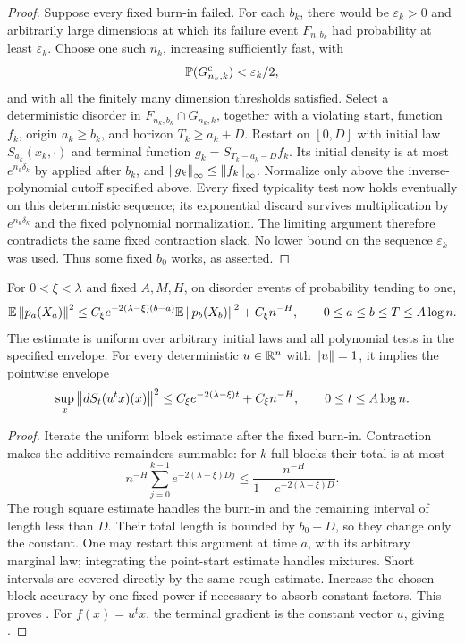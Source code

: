 \begin{proof}
Suppose every fixed burn-in failed.  For each $b_k$, there would be
$\varepsilon_k>0$ and arbitrarily large dimensions at which its
failure event $F_{n,b_k}$ had probability at least
$\varepsilon_k$.  Choose one such $n_k$, increasing sufficiently
fast, with
\[
 \P(G_{n_k,k}^{\mathrm c})<\varepsilon_k/2,
\]
and with all the finitely many dimension thresholds satisfied.  Select
a deterministic disorder in $F_{n_k,b_k}\cap G_{n_k,k}$, together
with a violating start, function $f_k$, origin $a_k\ge b_k$, and
horizon $T_k\ge a_k+D$.  Restart on $[0,D]$ with initial law
$S_{a_k}(x_k,\cdot)$ and terminal function
$g_k=S_{T_k-a_k-D}f_k$.  Its initial density is at most
$e^{n_k\delta_k}$ by  applied after
$b_k$, and $\norm{g_k}_\infty\le\norm{f_k}_\infty$.
Normalize only above the inverse-polynomial cutoff specified above.  Every fixed
typicality test now holds eventually on this deterministic sequence;
its exponential discard survives multiplication by
$e^{n_k\delta_k}$ and the fixed polynomial normalization.  The
limiting argument therefore contradicts the same fixed contraction
slack.  No lower bound on the sequence $\varepsilon_k$ was used.
Thus some fixed $b_0$ works, as asserted.
\end{proof}

\begin{proposition}
\label{prop:cutoff-gradient}
For $0<\xi<\lambda$ and fixed $A,M,H$, on disorder events of
probability tending to one,
\begin{equation}
 \E\norm{p_a(X_a)}^2
 \le C_\xi e^{-2(\lambda-\xi)(b-a)}
             \E\norm{p_b(X_b)}^2+C_\xi n^{-H},
 \qquad 0\le a\le b\le T\le A\log n.
 \label{eq:cutoff-propagation}
\end{equation}
The estimate is uniform over arbitrary initial laws and all polynomial
tests in the specified envelope.  For every deterministic $u\in\R^n$
with $\norm u=1$, it implies the pointwise envelope
\begin{equation}
 \sup_x\norm{dS_t(u^tx)(x)}^2
 \le C_\xi e^{-2(\lambda-\xi)t}+C_\xi n^{-H},
 \qquad 0\le t\le A\log n.
 \label{eq:cutoff-linear-envelope}
\end{equation}
\end{proposition}

\begin{proof}
Iterate the uniform block estimate after the fixed burn-in.  Contraction
makes the additive remainders summable: for $k$ full blocks their total
is at most
\[
 n^{-H}\sum_{j=0}^{k-1}e^{-2(\lambda-\xi)Dj}
 \le\frac{n^{-H}}{1-e^{-2(\lambda-\xi)D}}.
\]
The rough square estimate handles the burn-in and the remaining
interval of length less than $D$.  Their total length is bounded by
$b_0+D$, so they change only the constant.  One may restart this
argument at time $a$, with its arbitrary marginal law; integrating
the point-start estimate handles mixtures.  Short intervals are
covered directly by the same rough estimate.  Increase the chosen
block accuracy by one fixed power if necessary to absorb constant
factors.  This proves .  For $f(x)=u^tx$,
the terminal gradient is the constant vector $u$, giving
.
\end{proof}

